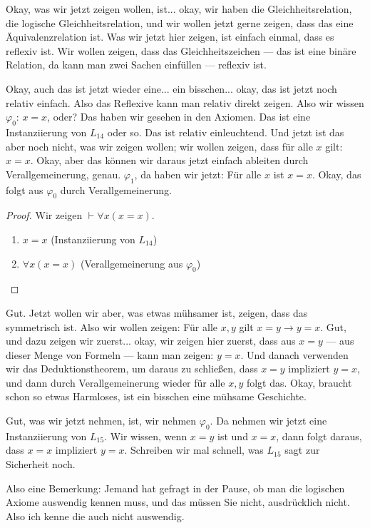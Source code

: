 \begin{spoken-clean}[00:54:27 - 00:55:10]
Okay, was wir jetzt zeigen wollen, ist... okay, wir haben die Gleichheitsrelation, die logische Gleichheitsrelation, und wir wollen jetzt gerne zeigen, dass das eine Äquivalenzrelation ist. Was wir jetzt hier zeigen, ist einfach einmal, dass es reflexiv ist. Wir wollen zeigen, dass das Gleichheitszeichen --- das ist eine binäre Relation, da kann man zwei Sachen einfüllen --- reflexiv ist.
\end{spoken-clean}

\begin{spoken-clean}[00:55:11 - 00:56:15]
Okay, auch das ist jetzt wieder eine... ein bisschen... okay, das ist jetzt noch relativ einfach. Also das Reflexive kann man relativ direkt zeigen. Also wir wissen $\varphi_0$: $x=x$, oder? Das haben wir gesehen in den Axiomen. Das ist eine Instanziierung von $L_{14}$ oder so. Das ist relativ einleuchtend. Und jetzt ist das aber noch nicht, was wir zeigen wollen; wir wollen zeigen, dass für alle $x$ gilt: $x=x$. Okay, aber das können wir daraus jetzt einfach ableiten durch Verallgemeinerung, genau. $\varphi_1$, da haben wir jetzt: Für alle $x$ ist $x=x$. Okay, das folgt aus $\varphi_0$ durch Verallgemeinerung.
\end{spoken-clean}

\begin{math-stroke}
\begin{proof}
Wir zeigen $\vdash \forall x (x = x)$.
\begin{enumerate}[label=$\varphi_{\mathbf{\arabic*}}:$]
    \setcounter{enumi}{0} \item $x = x$ \hfill (Instanziierung von $L_{14}$)
    \item $\forall x (x = x)$ \hfill (Verallgemeinerung aus $\varphi_0$)
\end{enumerate}
\end{proof}
\end{math-stroke}

\begin{spoken-clean}[00:56:17 - 00:58:28]
Gut. Jetzt wollen wir aber, was etwas mühsamer ist, zeigen, dass das symmetrisch ist. Also wir wollen zeigen: Für alle $x, y$ gilt $x=y \rightarrow y=x$. Gut, und dazu zeigen wir zuerst... okay, wir zeigen hier zuerst, dass aus $x=y$ --- aus dieser Menge von Formeln --- kann man zeigen: $y=x$. Und danach verwenden wir das Deduktionstheorem, um daraus zu schließen, dass $x=y$ impliziert $y=x$, und dann durch Verallgemeinerung wieder für alle $x, y$ folgt das. Okay, braucht schon so etwas Harmloses, ist ein bisschen eine mühsame Geschichte.

Gut, was wir jetzt nehmen, ist, wir nehmen $\varphi_0$. Da nehmen wir jetzt eine Instanziierung von $L_{15}$. Wir wissen, wenn $x=y$ ist und $x=x$, dann folgt daraus, dass $x=x$ impliziert $y=x$. Schreiben wir mal schnell, was $L_{15}$ sagt zur Sicherheit noch.

Also eine Bemerkung: Jemand hat gefragt in der Pause, ob man die logischen Axiome auswendig kennen muss, und das müssen Sie nicht, ausdrücklich nicht. Also ich kenne die auch nicht auswendig.
\end{spoken-clean}

